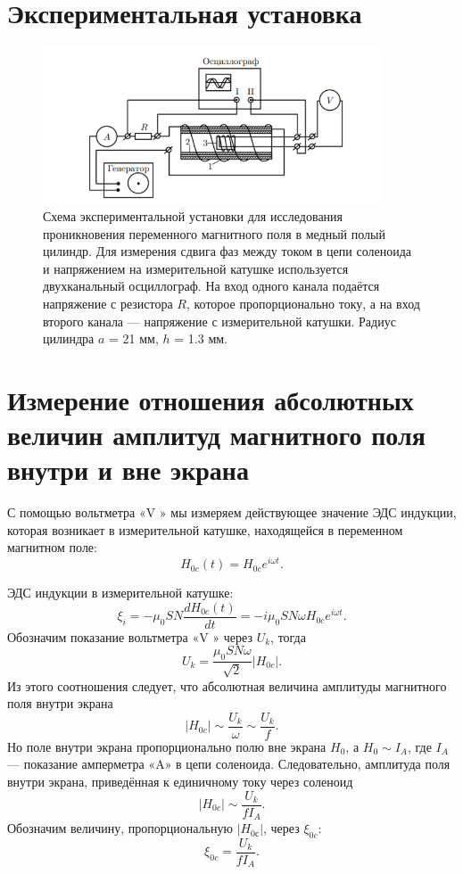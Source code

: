 \documentclass[a4paper, 14pt]{extarticle}%
\newcommand\ECaption[1]{%
     \captionsetup{font=footnotesize}%
     \caption{#1}}
\begin{document}
\section*{Экспериментальная установка}

\begin{figure}[h]
\begin{center}
\includegraphics[width=0.9\textwidth]{ust}
\end{center}
\ECaption{Схема экспериментальной установки для
исследования проникновения переменного магнитного поля в медный полый
цилиндр. Для измерения сдвига фаз между током в цепи соленоида и напряжением на измерительной
катушке используется двухканальный осциллограф. На вход одного канала
подаётся напряжение с резистора $R$, которое пропорционально току, а на
вход второго канала — напряжение с измерительной катушки. Радиус цилиндра $a$ = 21 мм, $h$ = 1.3 мм.}
\end{figure}

\section*{Измерение отношения абсолютных величин амплитуд магнитного поля внутри и вне экрана}
С помощью вольтметра «V » мы измеряем действующее значение ЭДС
индукции, которая возникает в измерительной катушке, находящейся в переменном магнитном поле:
\[H_{0c}(t) = H_{0c} e^{i\omega t}.\]

ЭДС индукции в измерительной катушке:
\[\xi_i= -\mu_0SN\frac{dH_{0c}(t)}{dt}=-i\mu_0SN\omega H_{0c}e^{i\omega t}.\]
Обозначим показание вольтметра «V » через $U_k$, тогда
\[U_k = \dfrac{\mu_0SN\omega}{\sqrt{2}}|H_{0c}|.\]
Из этого соотношения следует, что абсолютная величина амплитуды магнитного поля внутри экрана
\[|H_{0c}| \sim \dfrac{U_k}{\omega}\sim \dfrac{U_k}{f}.\]
Но поле внутри экрана
пропорционально полю вне экрана
$H_0$, а
 $H_0 \sim I_A$, где
$I_A$
— показание амперметра «A» в цепи соленоида. Следовательно, амплитуда поля внутри экрана,
приведённая
к единичному току через соленоид
\[|H_{0c}|\sim\dfrac{U_k}{fI_A}.\]
Обозначим величину, пропорциональную $|H_{0с}|$, через $\xi_{0c}$:
\begin{equation}
\xi_{0c} = \dfrac{U_k}{fI_A}.
\end{equation}
\end{document}
